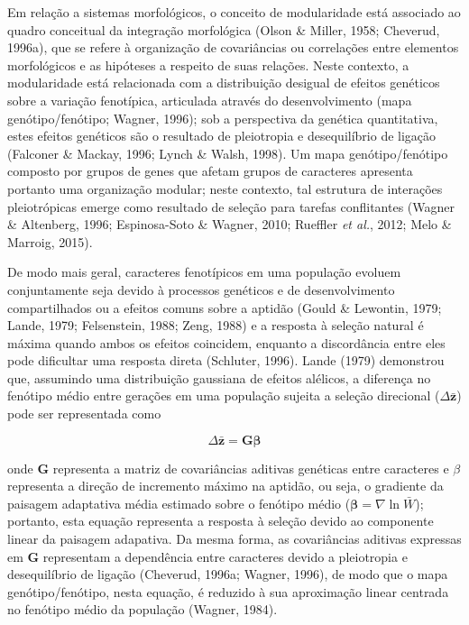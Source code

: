 \documentclass[12pt,twoside]{report}
\begin{document}
Em relação a sistemas morfológicos, o conceito de modularidade está
associado ao quadro conceitual da integração morfológica (Olson \&
Miller, 1958; Cheverud, 1996a), que se refere à organização de
covariâncias ou correlações entre elementos morfológicos e as hipóteses
a respeito de suas relações. Neste contexto, a modularidade está
relacionada com a distribuição desigual de efeitos genéticos sobre a
variação fenotípica, articulada através do desenvolvimento (mapa
genótipo/fenótipo; Wagner, 1996); sob a perspectiva da genética
quantitativa, estes efeitos genéticos são o resultado de pleiotropia e
desequilíbrio de ligação (Falconer \& Mackay, 1996; Lynch \& Walsh,
1998). Um mapa genótipo/fenótipo composto por grupos de genes que afetam
grupos de caracteres apresenta portanto uma organização modular; neste
contexto, tal estrutura de interações pleiotrópicas emerge como
resultado de seleção para tarefas conflitantes (Wagner \& Altenberg,
1996; Espinosa-Soto \& Wagner, 2010; Rueffler \emph{et al.}, 2012; Melo
\& Marroig, 2015).

De modo mais geral, caracteres fenotípicos em uma população evoluem
conjuntamente seja devido à processos genéticos e de desenvolvimento
compartilhados ou a efeitos comuns sobre a aptidão (Gould \& Lewontin,
1979; Lande, 1979; Felsenstein, 1988; Zeng, 1988) e a resposta à seleção
natural é máxima quando ambos os efeitos coincidem, enquanto a
discordância entre eles pode dificultar uma resposta direta (Schluter,
1996). Lande (1979) demonstrou que, assumindo uma distribuição gaussiana
de efeitos alélicos, a diferença no fenótipo médio entre gerações em uma
população sujeita a seleção direcional ($\Delta\bar{\mathbf{z}}$) pode
ser representada como

\begin{equation}
\Delta\bar{\mathbf{z}} = \mathbf{G}\boldsymbol{\beta}
\label{eq:lande}
\end{equation}

onde $\mathbf{G}$ representa a matriz de covariâncias aditivas genéticas
entre caracteres e $\beta$ representa a direção de incremento máximo na
aptidão, ou seja, o gradiente da paisagem adaptativa média estimado
sobre o fenótipo médio ($\boldsymbol{\beta} = \nabla \ln \bar{W}$);
portanto, esta equação representa a resposta à seleção devido ao
componente linear da paisagem adapativa. Da mesma forma, as covariâncias
aditivas expressas em $\mathbf{G}$ representam a dependência entre
caracteres devido a pleiotropia e desequilíbrio de ligação (Cheverud,
1996a; Wagner, 1996), de modo que o mapa genótipo/fenótipo, nesta
equação, é reduzido à sua aproximação linear centrada no fenótipo médio
da população (Wagner, 1984).
\end{document}
